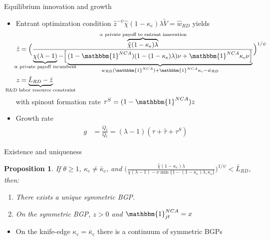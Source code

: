 \documentclass[english,usenames,dvipsnames]{beamer}
\newtheorem{proposition}{Proposition}
\begin{document}
\begin{frame}{Equilibrium innovation and growth}\label{eq_innovation_and_growth}
	\hyperlink{closing_the_model}{} 
	\begin{itemize}
		\item Entrant optimization condition $\hat{z}^{-\psi} \hat{\chi} (1-\kappa_e) \lambda \tilde{V}= \hat{w}_{RD}$ yields
		\begin{align*}
		\hat{z} &= \Big( \frac{ \overbrace{\hat{\chi} (1-\kappa_e) \lambda}^{\mathclap{\propto \text{ private payoff to entrant innovation}}}}{\underbrace{\chi(\lambda -1)}_{\mathclap{\propto \text{ private payoff incumbent}}} - \Big[\underbrace{(1-\mathbbm{1}^{NCA}) (1- (1-\kappa_e) \lambda)\nu + \mathbbm{1}^{NCA} \kappa_c \nu \Big]}_{\mathclap{w_{RD}(\mathbbm{1}^{NCA}) + \mathbbm{1}^{NCA} \kappa_c  - \hat{w}_{RD}}} }\Big)^{1/\psi} \\
		z &= \underbrace{\bar{L}_{RD} - \hat{z}}_{\mathclap{\text{R\&D labor resource constraint}}} 
		\end{align*}
		with spinout formation rate $\tau^S = (1-\mathbbm{1}^{NCA}) z$
		\item Growth rate
		\begin{align*}
		g &= \frac{\dot{Q}_t}{Q_t} = (\lambda - 1) (\tau + \hat{\tau} + \tau^S)
		\end{align*}
	\end{itemize}
\end{frame}


\begin{frame}{Existence and uniqueness}\label{existence_and_uniqueness}\hyperlink{eq_innovation_and_growth}{} 
	\begin{proposition}\label{proposition:purstrategyeq:positiveOI}
		If $\theta \ge 1$, $\kappa_c \ne \bar{\kappa}_c$, and $\Big( \frac{\hat{\chi} (1-\kappa_{e}) \lambda}{\chi(\lambda-1) - \nu \min\{ 1-(1-\kappa_e) \lambda, \kappa_c \}} \Big)^{1/\psi} < \bar{L}_{RD}$, then:
		\begin{enumerate}
			\item There exists a unique symmetric BGP.
			\item On the symmetric BGP, $z > 0$ and $\mathbbm{1}^{NCA}_{jt} = x$
		\end{enumerate}
	\end{proposition}
	\begin{itemize}
		\item On the knife-edge $\kappa_c = \bar{\kappa}_c$ there is a continuum of symmetric BGPs
	\end{itemize}
\end{frame}
\end{document}
